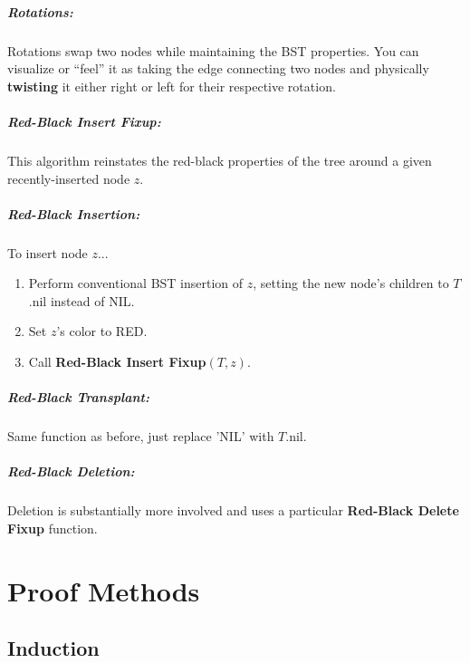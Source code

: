 \documentclass[a4paper,12pt]{report}
\begin{document}
\paragraph{Rotations: } Rotations swap two nodes while maintaining the BST properties. You can visualize or ``feel'' it as taking the edge connecting two nodes and physically \textbf{twisting} it either right or left for their respective rotation.

\paragraph{Red-Black Insert Fixup: } This algorithm reinstates the red-black properties of the tree around a given recently-inserted node $z$. 

\paragraph{Red-Black Insertion: } To insert node $z$...
\begin{enumerate}
\item Perform conventional BST insertion of $z$, setting the new node's children to $T$.nil instead of NIL.
\item Set $z$'s color to RED.
\item Call \textbf{Red-Black Insert Fixup}$(T, z)$.
\end{enumerate}

\paragraph{Red-Black Transplant: } Same function as before, just replace 'NIL' with $T$.nil.

\paragraph{Red-Black Deletion: } Deletion is substantially more involved and uses a particular \textbf{Red-Black Delete Fixup} function. 










\chapter{Proof Methods}

\section{Induction}
\end{document}
